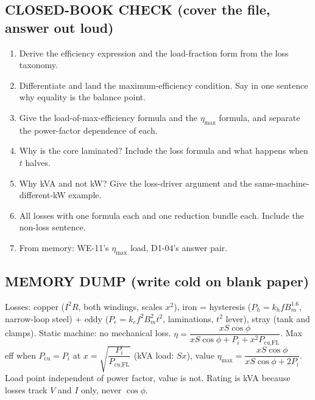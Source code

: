 \documentclass[11pt]{article}
\begin{document}
\subsection*{\color{copper}CLOSED-BOOK CHECK (cover the file, answer out loud)}
\begin{enumerate}[label=\arabic*.]
\item Derive the efficiency expression and the load-fraction form from the loss taxonomy.
\item Differentiate and land the maximum-efficiency condition. Say in one sentence why equality is the balance point.
\item Give the load-of-max-efficiency formula and the $\eta_{\text{max}}$ formula, and separate the power-factor dependence of each.
\item Why is the core laminated? Include the loss formula and what happens when $t$ halves.
\item Why kVA and not kW? Give the loss-driver argument and the same-machine-different-kW example.
\item All losses with one formula each and one reduction bundle each. Include the non-loss sentence.
\item From memory: WE-11's $\eta_{\text{max}}$ load, D1-04's answer pair.
\end{enumerate}

\subsection*{\color{copper}MEMORY DUMP (write cold on blank paper)}
Losses: copper ($I^{2}R$, both windings, scales $x^{2}$), iron = hysteresis ($P_h = k_h f B_m^{1.6}$, narrow-loop steel) + eddy ($P_e = k_e f^{2} B_m^{2} t^{2}$, laminations, $t^{2}$ lever), stray (tank and clamps). Static machine: no mechanical loss. $\eta = \dfrac{x S \cos\phi}{x S \cos\phi + P_i + x^{2} P_{\text{cu,FL}}}$. Max eff when $P_{\text{cu}} = P_i$ at $x = \sqrt{\dfrac{P_i}{P_{\text{cu,FL}}}}$ (kVA load: $S x$), value $\eta_{\text{max}} = \dfrac{x S \cos\phi}{x S \cos\phi + 2 P_i}$. Load point independent of power factor, value is not. Rating is kVA because losses track $V$ and $I$ only, never $\cos\phi$.
\end{document}
